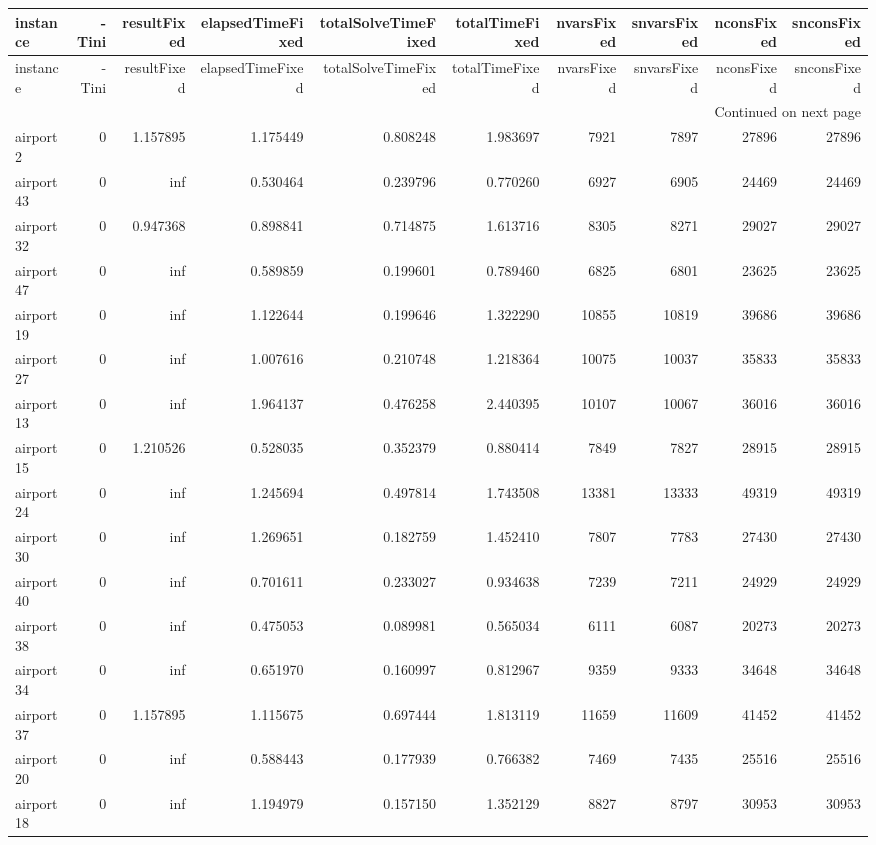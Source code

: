 \begin{longtable}{|l|r|r|r|r|r|r|r|r|r|}
\toprule
instance & -Tini & resultFixed & elapsedTimeFixed & totalSolveTimeFixed & totalTimeFixed & nvarsFixed & snvarsFixed & nconsFixed & snconsFixed \\
\midrule
\endfirsthead
\toprule
instance & -Tini & resultFixed & elapsedTimeFixed & totalSolveTimeFixed & totalTimeFixed & nvarsFixed & snvarsFixed & nconsFixed & snconsFixed \\
\midrule
\endhead
\midrule
\multicolumn{10}{r}{Continued on next page} \\
\midrule
\endfoot
\bottomrule
\endlastfoot
airport2 & 0 & 1.157895 & 1.175449 & 0.808248 & 1.983697 & 7921 & 7897 & 27896 & 27896 \\
airport43 & 0 & inf & 0.530464 & 0.239796 & 0.770260 & 6927 & 6905 & 24469 & 24469 \\
airport32 & 0 & 0.947368 & 0.898841 & 0.714875 & 1.613716 & 8305 & 8271 & 29027 & 29027 \\
airport47 & 0 & inf & 0.589859 & 0.199601 & 0.789460 & 6825 & 6801 & 23625 & 23625 \\
airport19 & 0 & inf & 1.122644 & 0.199646 & 1.322290 & 10855 & 10819 & 39686 & 39686 \\
airport27 & 0 & inf & 1.007616 & 0.210748 & 1.218364 & 10075 & 10037 & 35833 & 35833 \\
airport13 & 0 & inf & 1.964137 & 0.476258 & 2.440395 & 10107 & 10067 & 36016 & 36016 \\
airport15 & 0 & 1.210526 & 0.528035 & 0.352379 & 0.880414 & 7849 & 7827 & 28915 & 28915 \\
airport24 & 0 & inf & 1.245694 & 0.497814 & 1.743508 & 13381 & 13333 & 49319 & 49319 \\
airport30 & 0 & inf & 1.269651 & 0.182759 & 1.452410 & 7807 & 7783 & 27430 & 27430 \\
airport40 & 0 & inf & 0.701611 & 0.233027 & 0.934638 & 7239 & 7211 & 24929 & 24929 \\
airport38 & 0 & inf & 0.475053 & 0.089981 & 0.565034 & 6111 & 6087 & 20273 & 20273 \\
airport34 & 0 & inf & 0.651970 & 0.160997 & 0.812967 & 9359 & 9333 & 34648 & 34648 \\
airport37 & 0 & 1.157895 & 1.115675 & 0.697444 & 1.813119 & 11659 & 11609 & 41452 & 41452 \\
airport20 & 0 & inf & 0.588443 & 0.177939 & 0.766382 & 7469 & 7435 & 25516 & 25516 \\
airport18 & 0 & inf & 1.194979 & 0.157150 & 1.352129 & 8827 & 8797 & 30953 & 30953 \\

\end{longtable}
